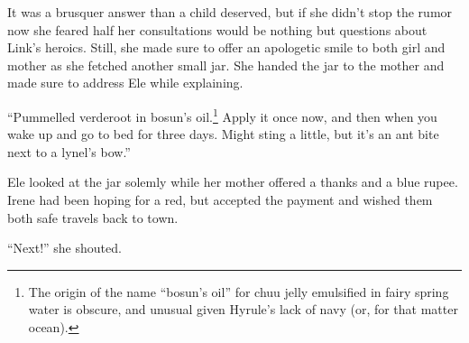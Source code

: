 \documentclass[../../FGP.tex]{subfiles}
\begin{document}
It was a brusquer answer than a child deserved, but if she didn't stop the rumor now she feared half her consultations would be nothing but questions about Link's heroics. Still, she made sure to offer an apologetic smile to both girl and mother as she fetched another small jar. She handed the jar to the mother and made sure to address Ele while explaining. 

``Pummelled verderoot in bosun's oil.\footnote{The origin of the name ``bosun's oil'' for chuu jelly emulsified in fairy spring water is obscure, and unusual given Hyrule's lack of navy (or, for that matter ocean).} Apply it once now, and then when you wake up and go to bed for three days. Might sting a little, but it's an ant bite next to a lynel's bow.'' 

Ele looked at the jar solemly while her mother offered a thanks and a blue rupee. Irene had been hoping for a red, but accepted the payment and wished them both safe travels back to town. 

``Next!'' she shouted. 

 
\end{document}
